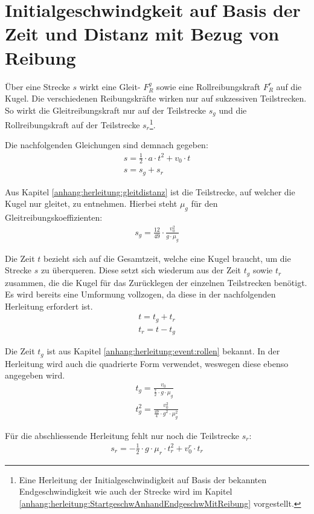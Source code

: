\section{Initialgeschwindgkeit auf Basis der Zeit und Distanz mit Bezug von Reibung}\label{anhang:herleitung:initialVelocityWithTime}
Über eine Strecke $s$ wirkt eine Gleit- $F^g_R$ sowie eine Rollreibungskraft $F^r_R$ auf die Kugel.
Die verschiedenen Reibungskräfte wirken nur auf sukzessiven Teilstrecken. So wirkt die Gleitreibungskraft nur auf
der Teilstrecke $s_g$ und die Rollreibungskraft auf der Teilstrecke $s_r$\footnote{Eine Herleitung der Initialgeschwindigkeit
auf Basis der bekannten Endgeschwindigkeit wie auch der Strecke wird im Kapitel \ref{anhang:herleitung:StartgeschwAnhandEndgeschwMitReibung} vorgestellt.}.

Die nachfolgenden Gleichungen sind demnach gegeben:
\begin{align}
    s = \frac{1}{2} \cdot a \cdot t^2 + v_0 \cdot t\\
    s = s_g + s_r
\end{align}

Aus Kapitel \ref{anhang:herleitung:gleitdistanz} ist die Teilstrecke, auf welcher die Kugel nur gleitet, zu entnehmen.
Hierbei steht $\mu_g$ für den Gleitreibungskoeffizienten:
\begin{align}
    s_g = \frac{12}{49} \cdot \frac{v_0^2}{g \cdot \mu_g}
\end{align}

Die Zeit $t$ bezieht sich auf die Gesamtzeit, welche eine Kugel braucht, um die Strecke $s$ zu überqueren.
Diese setzt sich wiederum aus der Zeit $t_g$ sowie $t_r$ zusammen, die die Kugel für das Zurücklegen der einzelnen
Teilstrecken benötigt. Es wird bereits eine Umformung vollzogen, da diese in der nachfolgenden Herleitung erfordert ist.
\begin{align}
    t = t_g + t_r\\
    t_r = t - t_g
\end{align}

Die Zeit $t_g$ ist aus Kapitel \ref{anhang:herleitung:event:rollen} bekannt. In der Herleitung wird auch die quadrierte
Form verwendet, weswegen diese ebenso angegeben wird.
\begin{align}
    t_g = \frac{v_0}{\frac{7}{2} \cdot g \cdot \mu_g}\\
    t_g^2 = \frac{v_0^2}{\frac{49}{4} \cdot g^2 \cdot \mu_g^2}
\end{align}

Für die abschliessende Herleitung fehlt nur noch die Teilstrecke $s_r$:
\begin{align}
    s_r = - \frac{1}{2} \cdot g \cdot \mu_r \cdot t_r^2 + v^r_0 \cdot t_r
\end{align}

